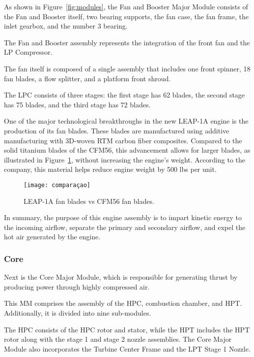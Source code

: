 As shown in Figure~\ref{fig:modules}, the Fan and Booster Major Module consists of the Fan and Booster itself, two bearing supports, the fan case, the fan frame, the inlet gearbox, and the number 3 bearing.

The Fan and Booster assembly represents the integration of the front fan and the \gls{LP} Compressor.
    
The fan itself is composed of a single assembly that includes one front spinner, 18 fan blades, a flow splitter, and a platform front shroud.
    
The \gls{LPC} consists of three stages: the first stage has 62 blades, the second stage has 75 blades, and the third stage has 72 blades.
    
One of the major technological breakthroughs in the new LEAP-1A engine is the production of its fan blades. These blades are manufactured using additive manufacturing with 3D-woven \gls{RTM} carbon fiber composites. Compared to the solid titanium blades of the CFM56, this advancement allows for larger blades, as illustrated in Figure~\ref{fig:blade_comparison}, without increasing the engine's weight. According to the company, this material helps reduce engine weight by 500 lbs per unit.

\begin{figure}[H]
    \centering
    \texttt{[image: comparaçao]}
    \caption{\gls{LEAP}-1A fan blades vs CFM56 fan blades.\cite{ESM}}
    \label{fig:blade_comparison}
\end{figure}

In summary, the purpose of this engine assembly is to impart kinetic energy to the incoming airflow, separate the primary and secondary airflow, and expel the hot air generated by the engine.

\subsubsection{Core}
\label{subsubsec:core}

Next is the Core Major Module, which is responsible for generating thrust by producing power through highly compressed air.

This \gls{MM} comprises the assembly of the \gls{HPC}, combustion chamber, and \gls{HPT}. Additionally, it is divided into nine sub-modules.

The \gls{HPC} consists of the HPC rotor and stator, while the \gls{HPT} includes the HPT rotor along with the stage 1 and stage 2 nozzle assemblies. The Core Major Module also incorporates the Turbine Center Frame and the \gls{LPT} Stage 1 Nozzle.

